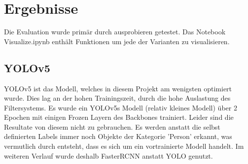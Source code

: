 \chapter{Ergebnisse}

Die Evaluation wurde primär durch ausprobieren getestet. 
Das Notebook Visualize.ipynb enthält Funktionen um jede der Varianten zu visualisieren.

\section{YOLOv5}
YOLOv5 ist das Modell, welches in diesem Projekt am wenigsten optimiert wurde.
Dies lag an der hohen Trainingszeit, durch die hohe Auslastung des Filtersystems.
Es wurde ein YOLOv5s Modell (relativ kleines Modell) über 2 Epochen mit einigen Frozen Layern des Backbones trainiert.
Leider sind die Resultate von diesem nicht zu gebrauchen.
Es werden anstatt die selbst definierten Labels immer noch Objekte der Kategorie 'Person' erkannt, was vermutlich durch entsteht, dass es sich um ein vortrainierte Modell handelt.
Im weiteren Verlauf wurde deshalb FasterRCNN anstatt YOLO genutzt.

